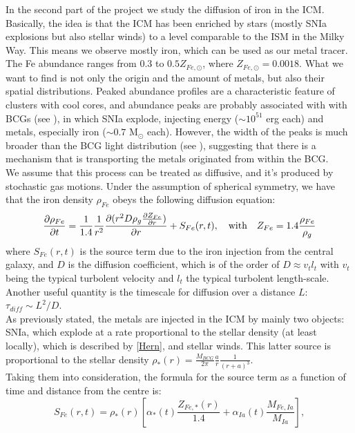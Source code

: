 \documentclass{article}
\begin{document}
In the second part of the project we study the diffusion of iron in the ICM. Basically, the idea is that the ICM has been enriched by stars (mostly SNIa explosions but also stellar winds) to a level comparable to the ISM in the Milky Way. This means we observe mostly iron, which can be used as our metal tracer.
The Fe abundance ranges from $0.3$ to $0.5 Z_{Fe,\odot}$, where $Z_{Fe,\odot}=0.0018$.
What we want to find is not only the origin and the amount of metals, but also their spatial distributions. Peaked abundance profiles are a characteristic feature of clusters with cool cores, and abundance peaks are probably associated with with BCGs (see \cite{rebusco}), in which SNIa explode, injecting energy ($\sim 10^{51}$ erg each) and metals, especially iron ($\sim 0.7$ M$_{\odot}$ each).
However, the width of the peaks is much broader than the BCG light distribution (see \cite[text]{grandi}), suggesting that there is a mechanism that is transporting the metals originated from within the BCG.\\ 
We assume that this process can be treated as diffusive, and it's produced by stochastic gas motions. Under the assumption of spherical symmetry, we have that the iron density $\rho_{Fe}$ obeys the following diffusion equation:
\begin{equation} \label{diffeq}
	\pdv{\rho_{Fe}}{t}=\frac{1}{1.4}\frac{1}{r^{2}}\pdv{(r^{2}D\rho_{g}\pdv{Z_{Fe}}{r})}{r}+S_{Fe}(r,t), \quad \text{with}\quad Z_{Fe}=1.4\frac{\rho_{Fe}}{\rho_{g}}
\end{equation} 
where $S_{Fe}(r,t)$ is the source term due to the iron injection from the central galaxy, and $D$ is the diffusion coefficient, which is of the order of $D\approx v_{t}l_{t}$ with $v_{t}$ being the typical turbolent velocity and $l_{t}$ the typical turbolent length-scale. Another useful quantity is the timescale for diffusion over a distance $L$: $\tau_{diff}\sim L^{2}/D$.\\
As previously stated, the metals are injected in the ICM by mainly two objects: SNIa, which explode at a rate proportional to the stellar density (at least locally), which is described
by \eqref{Hern}, and stellar winds. This latter source is proportional to the stellar density $\rho_{*}(r)=\frac{M_{BCG}}{2\pi}\frac{a}{r}\frac{1}{(r+a)^{3}}$.\\
Taking them into consideration, the formula for the source term as a function of time and distance from the centre is:
\begin{equation} \label{source}
		S_{Fe}(r,t)=\rho_{*}(r)\left[\alpha_{*}(t)\frac{Z_{Fe,*}(r)}{1.4}+\alpha_{Ia}(t)\frac{M_{Fe,Ia}}{M_{Ia}}\right],
\end{equation}
\end{document}
